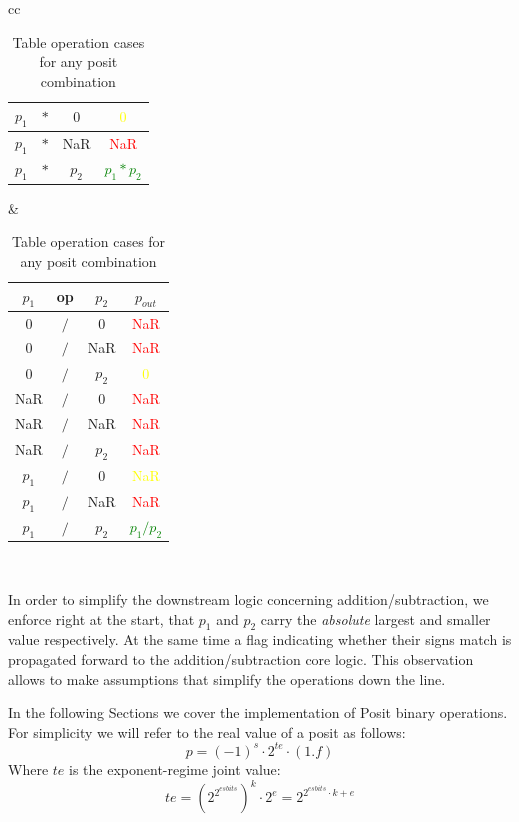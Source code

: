\begin{table}
\begin{center}
\begin{tabular}{ cc }
\begin{tabular}{||c c c | c||}
    \hline
    $p_1$ & $*$ & $0$ & \textcolor{yellow}{$0$} \\
    \hline
    $p_1$ & $*$ & NaR & \textcolor{red}{NaR} \\
    \hline
    $p_1$ & $*$ & $p_2$ & \textcolor{green}{$p_1 * p_2$} \\
    \hline
\end{tabular} &
\begin{tabular}{||c c c | c||}
    \hline
    $p_1$ & op & $p_2$ & $p_{out}$ \\ [0.5ex]
    \hline\hline
    $0$ & $/$ & $0$ & \textcolor{red}{NaR} \\
    \hline
    $0$ & $/$ & NaR & \textcolor{red}{NaR} \\
    \hline
    $0$ & $/$ & $p_2$ & \textcolor{yellow}{$0$} \\ %
    \hline
    NaR & $/$ & $0$ & \textcolor{red}{NaR} \\
    \hline
    NaR & $/$ & NaR & \textcolor{red}{NaR} \\
    \hline
    NaR & $/$ & $p_2$ & \textcolor{red}{NaR} \\ %
    \hline
    $p_1$ & $/$ & $0$ & \textcolor{yellow}{NaR} \\
    \hline
    $p_1$ & $/$ & NaR & \textcolor{red}{NaR} \\
    \hline
    $p_1$ & $/$ & $p_2$ & \textcolor{green}{$p_1 / p_2$} \\
    \hline
\end{tabular} \\
\end{tabular}
\end{center}
\caption{Table operation cases for any posit combination}
\label{table:table_posit_op_combination}
\end{table}







In order to simplify the downstream logic concerning addition/subtraction, we enforce right at the start, that $p_1$ and $p_2$ carry the \textit{absolute} largest and smaller value respectively. At the same time a flag indicating whether their signs match is propagated forward to the addition/subtraction core logic. This observation allows to make assumptions that simplify the operations down the line.




In the following Sections we cover the implementation of Posit binary operations. For simplicity we will refer to the real value of a posit as follows:
\begin{equation}\label{eqn:posit_equation}
    p = (-1)^{s} \cdot 2^{te} \cdot (1.f)
\end{equation}
Where $te$ is the exponent-regime joint value:
\begin{equation}
    te = (2^{2^{esbits}})^{k} \cdot 2^{e} = 2^{2^{esbits}\cdot k + e}
\end{equation}

